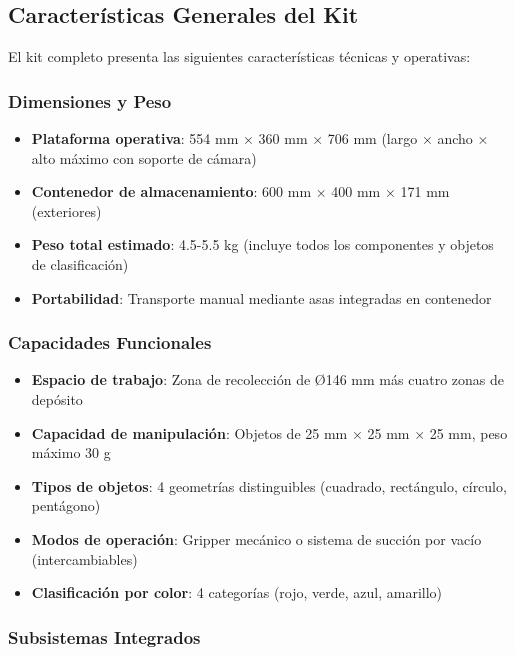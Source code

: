 \subsection{Características Generales del Kit}

El kit completo presenta las siguientes características técnicas y operativas:

\subsubsection{Dimensiones y Peso}

\begin{itemize}
    \item \textbf{Plataforma operativa}: 554 mm × 360 mm × 706 mm (largo × ancho × alto máximo con soporte de cámara)
    \item \textbf{Contenedor de almacenamiento}: 600 mm × 400 mm × 171 mm (exteriores)
    \item \textbf{Peso total estimado}: 4.5-5.5 kg (incluye todos los componentes y objetos de clasificación)
    \item \textbf{Portabilidad}: Transporte manual mediante asas integradas en contenedor
\end{itemize}

\subsubsection{Capacidades Funcionales}

\begin{itemize}
    \item \textbf{Espacio de trabajo}: Zona de recolección de Ø146 mm más cuatro zonas de depósito
    \item \textbf{Capacidad de manipulación}: Objetos de 25 mm × 25 mm × 25 mm, peso máximo 30 g
    \item \textbf{Tipos de objetos}: 4 geometrías distinguibles (cuadrado, rectángulo, círculo, pentágono)
    \item \textbf{Modos de operación}: Gripper mecánico o sistema de succión por vacío (intercambiables)
    \item \textbf{Clasificación por color}: 4 categorías (rojo, verde, azul, amarillo)
\end{itemize}

\subsubsection{Subsistemas Integrados}


